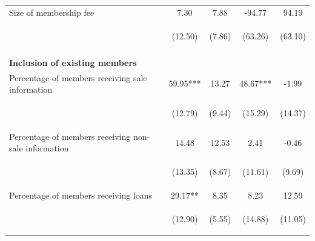 \documentclass[11pt]{article}
\begin{document}
\begin{table}[H]
{\begin{tabularx}{1.3\linewidth}{lcccc}
\noalign{\smallskip}Size of membership fee & 7.30 & 7.88 & -94.77 & 94.19\\
 & \begin{footnotesize}(12.50)\end{footnotesize} & \begin{footnotesize}(7.86)\end{footnotesize} & \begin{footnotesize}(63.26)\end{footnotesize} & \begin{footnotesize}(63.10)\end{footnotesize}\\ \\
 
 \textbf{Inclusion of existing members} & & & & \\
\noalign{\smallskip}Percentage of members receiving sale information & 59.95*** & 13.27 & 48.67*** & -1.99\\
 & \begin{footnotesize}(12.79)\end{footnotesize} & \begin{footnotesize}(9.44)\end{footnotesize} & \begin{footnotesize}(15.29)\end{footnotesize} & \begin{footnotesize}(14.37)\end{footnotesize}\\
\noalign{\smallskip}Percentage of members receiving non-sale information & 14.48 & 12.53 & 2.41 & -0.46\\
 & \begin{footnotesize}(13.35)\end{footnotesize} & \begin{footnotesize}(8.67)\end{footnotesize} & \begin{footnotesize}(11.61)\end{footnotesize} & \begin{footnotesize}(9.69)\end{footnotesize}\\
\noalign{\smallskip}Percentage of members receiving loans & 29.17** & 8.35 & 8.23 & 12.59\\
 & \begin{footnotesize}(12.90)\end{footnotesize} & \begin{footnotesize}(5.55)\end{footnotesize} & \begin{footnotesize}(14.88)\end{footnotesize} & \begin{footnotesize}(11.05)\end{footnotesize}\\

\end{tabularx}}
\end{table}
\end{document}
